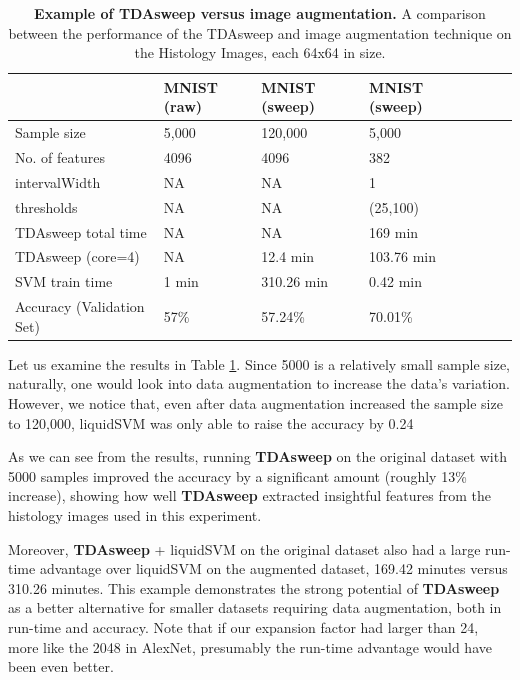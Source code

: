 \documentclass{article}
\begin{document}
\begin{table}[!ht]
\centering
\caption{{\bf Example of TDAsweep versus image augmentation.} A comparison between the performance of the TDAsweep and image augmentation technique on the Histology Images, each 64x64 in size.}
\begin{tabular}{|l|l|l|l|l|l|l|}
\hline
\multicolumn{1}{|l|}{} & \multicolumn{1}{|l|}{\bf MNIST (raw)} & \multicolumn{1}{|l|}{\bf MNIST (sweep)} & \multicolumn{1}{|l|}{\bf MNIST (sweep)}\\ \hline
Sample size & 5,000 & 120,000 & 5,000  \\ \hline
No. of features & 4096 & 4096 & 382  \\ \hline
intervalWidth & NA & NA & 1  \\ \hline
thresholds & NA & NA & (25,100)  \\ \hline
TDAsweep total time & NA & NA & 169 min  \\ \hline
TDAsweep (core=4) & NA & 12.4 min & 103.76 min  \\ \hline
SVM train time & 1 min & 310.26 min & 0.42 min  \\ \hline
Accuracy (Validation Set) & 57\% & 57.24\% & 70.01\% \\ \hline
\end{tabular}
\label{tda_aug}
\end{table}

Let us examine the results in Table \ref{tda_aug}. Since 5000 is a relatively small sample size, naturally, one would look into data augmentation to increase the data's variation. However, we notice that, even after data augmentation increased the sample size to 120,000, liquidSVM was only able to raise the accuracy by 0.24%

As we can see from the results, running \textbf{TDAsweep} on the original dataset with 5000 samples improved the accuracy by a significant amount (roughly 13\% increase), showing how well \textbf{TDAsweep} extracted insightful features from the histology images used in this experiment.

Moreover, \textbf{TDAsweep} + liquidSVM on the original dataset also had a large run-time advantage over liquidSVM on the augmented dataset, 169.42 minutes versus 310.26 minutes. This example demonstrates the strong potential of \textbf{TDAsweep} as a better alternative for smaller datasets requiring data augmentation, both in run-time and accuracy. Note that if our expansion factor had larger than 24, more like the 2048 in AlexNet, presumably the run-time advantage would have been even better.
\end{document}
